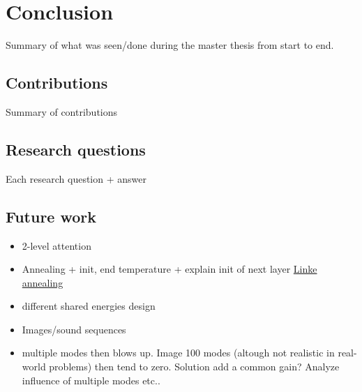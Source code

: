 \chapter{Conclusion} 
\label{chapter-7} 

Summary of what was seen/done during the master thesis from start to end. 


\section{Contributions}
Summary of contributions



\section{Research questions}
Each research question + answer



\section{Future work}
\begin{itemize}
\item 2-level attention
\item Annealing + init, end temperature + explain init of next layer \href{http://what-when-how.com/artificial-intelligence/a-comparison-of-cooling-schedules-for-simulated-annealing-artificial-intelligence/}{Linke annealing}
\item different shared energies design
\item Images/sound sequences
\item multiple modes then blows up. Image 100 modes (altough not realistic in real-world problems) then tend to zero. Solution add a common gain? Analyze influence of multiple modes etc..
\end{itemize}


